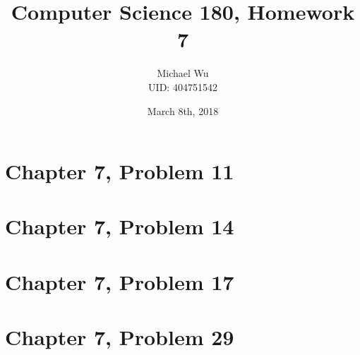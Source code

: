 \documentclass[12pt]{article}
\begin{document}
\title{Computer Science 180, Homework 7}
\date{March 8th, 2018}
\author{Michael Wu\\UID: 404751542}
\maketitle

\section*{Chapter 7, Problem 11}

\pagebreak

\section*{Chapter 7, Problem 14}

\pagebreak

\section*{Chapter 7, Problem 17}

\pagebreak

\section*{Chapter 7, Problem 29}
\end{document}
